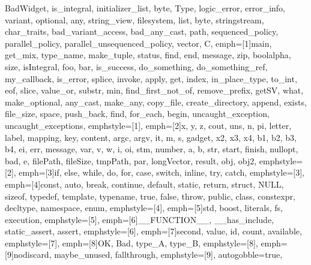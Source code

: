 {{              BadWidget, is_integral, initializer_list, byte, Type, logic_error,
              error_info, variant, optional, any, string_view, filesystem, list, byte,
              stringstream, char_traits, bad_variant_access, bad_any_cast, path,
              sequenced_policy, parallel_policy, parallel_unsequenced_policy, vector, C},
emph=[1]{main, get_mix, type_name, make_tuple, status, find, end, message, zip, boolalpha, size,
         isIntegral,  foo, bar, is_success, do_something, do_something_ref, my_callback, is_error,
         splice, invoke, apply, get, index, in_place_type, to_int, eof, slice, value_or,
         substr, min, find_first_not_of, remove_prefix, getSV, what, make_optional, any_cast, make_any,
         copy_file, create_directory, append, exists, file_size, space, push_back, find,
         for_each, begin, uncaught_exception, uncaught_exceptions},
emphstyle=[1]{\color{NavyBlue}}, %
emph=[2]{x, y, z, cout, uns, n, pi, letter, label, mapping, key, content, argc, argv, it, m, s,
         gadget, x2, x3, x4, b1, b2, b3, b4, ei, err, message, var, v, w, i, oi, stm, number, a, b,
         str, start, finish, nullopt, bad, e, filePath, fileSize, tmpPath, par, longVector, result,
         obj, obj2},
emphstyle=[2]{\color{Orange}}, %
emph=[3]{if, else, while, do, for, case, switch, inline, try, catch},
emphstyle=[3]{\color{violet}}, %
emph=[4]{const, auto, break, continue, default, static, return, struct, NULL, sizeof, typedef,
         template, typename, true, false, throw, public, class, constexpr, decltype, namespace, enum},
emphstyle=[4]{\color{ProcessBlue}}, %
emph=[5]{std, boost, literals, fs, execution},
emphstyle=[5]{\color{Maroon}}, %
emph=[6]{__FUNCTION__, __has_include, static_assert, assert},
emphstyle=[6]{\color{Gray}}, %
emph=[7]{second, value, id, count, available},
emphstyle=[7]{\color{Peach!50!Purple}}, %
emph=[8]{OK, Bad, type_A, type_B},
emphstyle=[8]{\color{Blue}}, %
emph=[9]{nodiscard, maybe_unused, fallthrough},
emphstyle=[9]{\color{Goldenrod!50!black}}, %
autogobble=true, %
}



